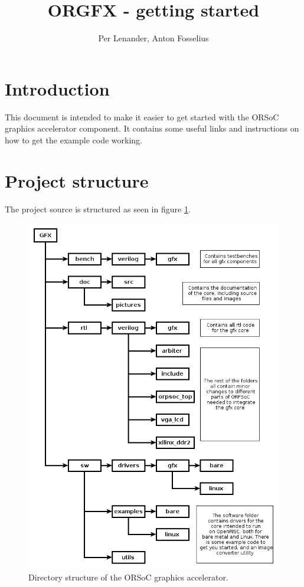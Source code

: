 \documentclass[10pt,a4paper]{article}
\author{Per Lenander, Anton Fosselius}
\title{ORGFX - getting started}
\begin{document}
\maketitle

\section{Introduction}
This document is intended to make it easier to get started with the ORSoC graphics accelerator component. It contains some useful links and instructions on how to get the example code working.

\newpage

\section{Project structure}

The project source is structured as seen in figure \ref{fig:directory}.

\begin{figure}
\begin{center}
\includegraphics[scale=0.5]{../pictures/directory}
\caption{Directory structure of the ORSoC graphics accelerator.}
\label{fig:directory}
\end{center}
\end{figure}
\end{document}
